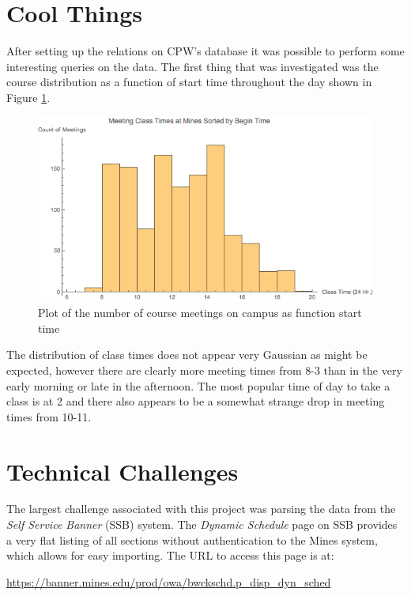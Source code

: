 \documentclass[12pt,letterpaper,titlepage]{article}
\begin{document}
\section{Cool Things}
After setting up the relations on CPW's database it was possible to perform some interesting queries on the data. The first thing that was investigated was the course distribution as a function of start time throughout the day shown in Figure \ref{fig:starthours}.

\begin{figure}[H]
\centering
\includegraphics[width = 4 in]{classmeetinghist.png}
\caption{\label{fig:starthours}Plot of the number of course meetings on campus as function start time}
\end{figure}

The distribution of class times does not appear very Gaussian as might be expected, however there are clearly more meeting times from 8-3 than in the very early morning or late in the afternoon. The most popular time of day to take a class is at 2 and there also appears to be a somewhat strange drop in meeting times from 10-11. 


\section{Technical Challenges}

The largest challenge associated with this project was parsing the data from
the \emph{Self Service Banner} (SSB) system. The \emph{Dynamic Schedule} page
on SSB provides a very flat listing of all sections without authentication to
the Mines system, which allows for easy importing. The URL to access this page
is at:

\begin{center}
    \url{https://banner.mines.edu/prod/owa/bwckschd.p_disp_dyn_sched}
\end{center}
\end{document}
